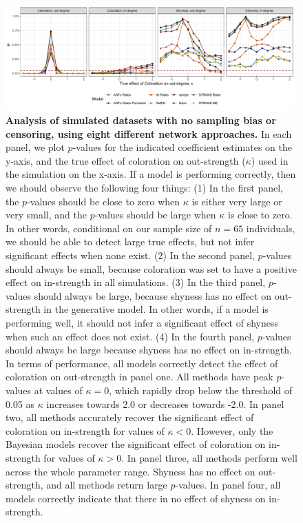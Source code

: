 \documentclass[Afour,sageh,times]{sagej}
\begin{document}
\begin{figure}[t]
  \caption{\textbf{Analysis of simulated datasets with no sampling bias or censoring, using eight different network approaches.} In each panel, we plot $p$-values for the indicated coefficient estimates on the y-axis, and the true effect of coloration on out-strength ($\kappa$) used in the simulation  on the x-axis. If a model is performing correctly, then we should observe the following four things: (1) In the first panel, the $p$-values should be close to zero when $\kappa$ is either very large or very small, and the $p$-values should be large when $\kappa$ is close to zero. In other words, conditional on our sample size of $n=65$ individuals, we should be able to detect large true effects, but not infer significant effects when none exist.  (2) In the second panel, $p$-values should always be small, because coloration was set to have a positive effect on in-strength in all simulations. (3) In the third panel, $p$-values should always be large, because shyness has no effect on out-strength in the generative model. In other words, if a model is performing well, it should not infer a significant effect of shyness when such an effect does not exist. (4)  In the fourth panel, $p$-values should always be large because shyness has no effect on in-strength. In terms of performance, all models correctly detect the effect of coloration on out-strength in panel one. All methods have peak $p$-values at values of $\kappa=0$, which rapidly drop below the threshold of 0.05 as $\kappa$ increases towards 2.0 or decreases towards -2.0.  In panel two, all methods accurately recover the significant effect of coloration on in-strength for values of $\kappa<0$. However, only the Bayesian models recover the significant effect of coloration on in-strength for values of $\kappa>0$. In panel three, all methods perform well across the whole parameter range. Shyness has no effect on out-strength, and all methods return large $p$-values.  In panel four, all models correctly indicate that there in no effect of shyness on in-strength. }  \label{res1}
  \centering
    \includegraphics[width=0.99\textwidth]{Figures/Basic_model}
\end{figure}
\end{document}
